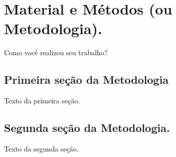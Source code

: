 \chapter{Material e Métodos (ou Metodologia).}
\label{ch:metodologia}

Como você realizou seu trabalho?

\section{Primeira seção da Metodologia}

Texto da primeira seção.

\section{Segunda seção da Metodologia.}

Texto da segunda seção.

